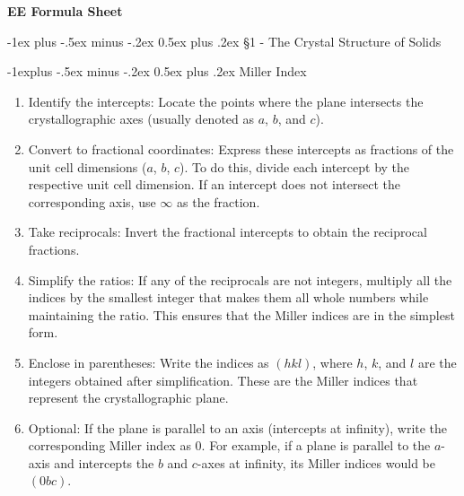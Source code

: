 \documentclass[10pt,landscape]{article}
\makeatletter
\renewcommand{\section}{\@startsection{section}{1}{0mm}%
                                {-1ex plus -.5ex minus -.2ex}%
                                {0.5ex plus .2ex}%
                                {\normalfont\large\bfseries}}
\renewcommand{\subsection}{\@startsection{subsection}{2}{0mm}%
                                {-1explus -.5ex minus -.2ex}%
                                {0.5ex plus .2ex}%
                                {\normalfont\normalsize\bfseries}}
\makeatother
\begin{document}
\raggedright
\footnotesize
\begin{multicols}{3}


\setlength{\premulticols}{1pt}
\setlength{\postmulticols}{1pt}
\setlength{\multicolsep}{1pt}
\setlength{\columnsep}{2pt}

\begin{center}
     \Large{\textbf{EE Formula Sheet}} \\
\end{center}

\newlength{\MyLen}

\section{\S1 - The Crystal Structure of Solids}

\subsection{Miller Index}

\begin{enumerate}
	\item Identify the intercepts: Locate the points where the plane intersects the crystallographic axes (usually denoted as $a$, $b$, and $c$).
	\item Convert to fractional coordinates: Express these intercepts as fractions of the unit cell dimensions ($a$, $b$, $c$). To do this, divide each intercept by the respective unit cell dimension. If an intercept does not intersect the corresponding axis, use $\infty$ as the fraction.
	\item Take reciprocals: Invert the fractional intercepts to obtain the reciprocal fractions.
	\item Simplify the ratios: If any of the reciprocals are not integers, multiply all the indices by the smallest integer that makes them all whole numbers while maintaining the ratio. This ensures that the Miller indices are in the simplest form.
	\item Enclose in parentheses: Write the indices as $(hkl)$, where $h$, $k$, and $l$ are the integers obtained after simplification. These are the Miller indices that represent the crystallographic plane.
	\item Optional: If the plane is parallel to an axis (intercepts at infinity), write the corresponding Miller index as 0. For example, if a plane is parallel to the $a$-axis and intercepts the $b$ and $c$-axes at infinity, its Miller indices would be $(0bc)$.
\end{enumerate}


\end{multicols}
\end{document}
